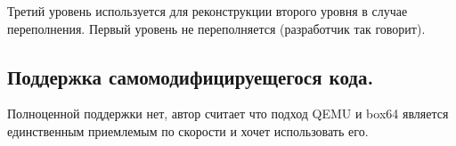Третий уровень используется для реконструкции второго уровня в случае переполнения. Первый уровень не переполняется (разработчик так говорит).

\subsection{Поддержка самомодифицируещегося кода.}
Полноценной поддержки нет, автор считает что подход QEMU и box64 является единственным приемлемым по скорости и хочет использовать его.

\pagebreak